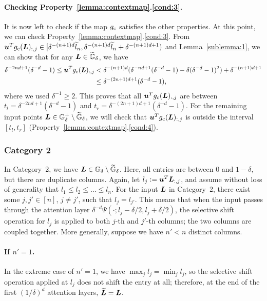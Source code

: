 \paragraph{Checking Property~\ref{lemma:contextmap}.\ref{cond:3}.}
It is now left to check if the map $g_{\rm c}$ satisfies the other properties.
At this point, we can check Property~\ref{lemma:contextmap}.\ref{cond:3}. 
From 
${\bm{u}}^T g_{\rm c}({\bm{L}})_{:,j} \in [\delta^{-(n+1)d} \widetilde{l}_n, \delta^{-(n+1)d} \widetilde{l}_n + \delta^{-(n+1)d+1})$ and Lemma~\ref{sublemma:1}, we can show that for any ${\bm{L}} \in \widetilde{{\mathbb{G}}}_{\delta}$, we have
\begin{align*}
    \delta^{-2nd+1}(\delta^{-d} - 1) 
    \leq {\bm{u}}^T g_{\rm c}({\bm{L}})_{:,j} 
    &< \delta^{-(n+1)d}(\delta^{-nd + 1}(\delta^{-d}-1) - \delta (\delta^{-d} - 1)^2) + \delta^{-(n+1)d+1}\\
    &\leq \delta^{-(2n+1)d+1}(\delta^{-d}-1),
\end{align*}
where we used $\delta^{-1} \geq 2$.
This proves that all ${\bm{u}}^T g_{\rm c}({\bm{L}})_{:,j}$ are between $t_l = \delta^{-2nd+1}(\delta^{-d} - 1)$ and $t_r = \delta^{-(2n+1)d+1}(\delta^{-d}-1)$.
For the remaining input points ${\bm{L}} \in {\mathbb{G}}^+_{\delta} \setminus \widetilde{{\mathbb{G}}}_{\delta}$, we will check that ${\bm{u}}^T g_{\rm c}({\bm{L}})_{:,j}$ is outside the interval $[t_l , t_r]$ (Property~\ref{lemma:contextmap}.\ref{cond:4}).

\subsubsection{Category 2}
In Category~2, we have ${\bm{L}} \in {\mathbb{G}}_{\delta}\setminus \widetilde{{\mathbb{G}}}_{\delta}$. Here, all entries are between $0$ and $1-\delta$, but there are duplicate columns.
Again, let $l_j := {\bm{u}}^T {\bm{L}}_{:,j}$, and assume without loss of generality that $l_1 \leq l_2 \leq \dots \leq l_n$. 
For the input ${\bm{L}}$ in Category~2, there exist some $j, j' \in [n]$, $j \neq j'$, such that $l_j = l_{j'}$.
This means that when the input passes through the attention layer $\delta^{-d}\Psi(\cdot; l_j - \delta/2, l_j + \delta/2)$, the selective shift operation for $l_j$ is applied to both $j$-th and $j'$-th columns; the two columns are coupled together.
More generally, suppose we have $n' < n$ distinct columns.

\paragraph{If $n'= 1$.}
In the extreme case of $n' = 1$, we have $\max_j l_j = \min_j l_j$, so the selective shift operation applied at $l_j$ does not shift the entry at all; therefore, at the end of the first $(1/\delta)^d$ attention layers, $\widetilde{{\bm{L}}} = {\bm{L}}$.

